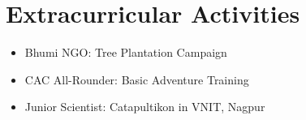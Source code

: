 \documentclass[letterpaper,11pt]{article}
\newcommand{\resumeItem}[1]{
  \item\small{
    {#1 \vspace{-2pt}}
  }
}
\newcommand{\resumeItemListStart}{\begin{itemize}}
\newcommand{\resumeItemListEnd}{\end{itemize}\vspace{-5pt}}
\begin{document}
\section{Extracurricular Activities}
 \begin{itemize}[leftmargin=0.15in, label={}]
    \small{\item{
     \resumeItemListStart
            \resumeItem{Bhumi NGO: Tree Plantation Campaign}
            \resumeItem{CAC All-Rounder: Basic Adventure Training}
            \resumeItem{Junior Scientist: Catapultikon in VNIT, Nagpur}
             \resumeItemListEnd
    }}
 \end{itemize}


\end{document}
